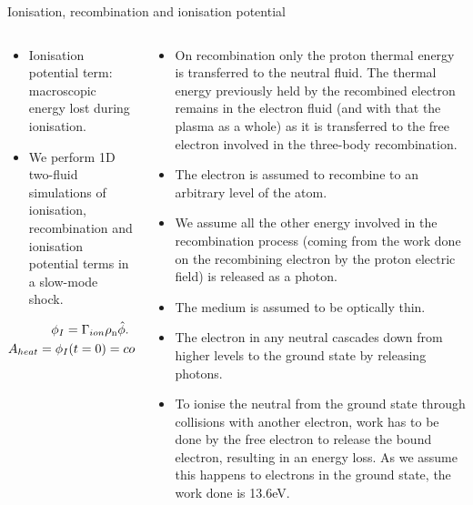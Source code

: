 \documentclass[10pt,aspectratio=169,usenames,dvipsnames]{beamer}
\begin{document}
\begin{frame}{Ionisation, recombination and ionisation potential}
\begin{columns}
\begin{column}{0.4\textwidth}
\begin{itemize}
    \item Ionisation potential term: macroscopic energy lost during ionisation. %
    \item We perform 1D two-fluid simulations of ionisation, recombination and ionisation potential terms in a slow-mode shock.
\end{itemize}
\begin{gather}
    \phi _I = \Gamma _{ion} \rho _{\rm n} \hat{\phi}. \nonumber \\
    A_{heat}=\phi _I(t=0)=constant \nonumber
\end{gather}
\end{column}
\begin{column}{0.6\textwidth}
\footnotesize
\begin{itemize}
    \item On recombination only the proton thermal energy is transferred to the neutral fluid. The thermal energy previously held by the recombined electron remains in the electron fluid (and with that the plasma as a whole) as it is transferred to the free electron involved in the three-body recombination.
    \item The electron is assumed to recombine to an arbitrary level of the atom. 
    \item We assume all the other energy involved in the recombination process (coming from the work done on the recombining electron by the proton electric field) is released as a photon.
    \item The medium is assumed to be optically thin.
    \item The electron in any neutral cascades down from higher levels to the ground state by releasing photons.
    \item To ionise the neutral from the ground state through collisions with another electron, work has to be done by the free electron to release the bound electron, resulting in an energy loss. As we assume this happens to electrons in the ground state, the work done is 13.6eV.
\end{itemize}
\end{column}
\end{columns}
\end{frame}
\end{document}

